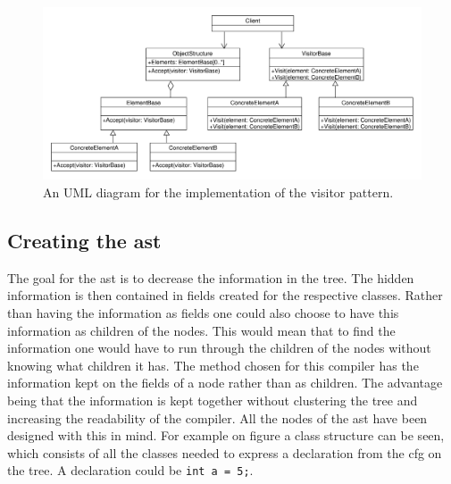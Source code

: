 \begin{figure}[!ht]
\centering
 \includegraphics[width=1\textwidth]{figures/ClassDiagrams/VisitorPattern.pdf} %
\caption{An UML diagram for the implementation of the visitor pattern.}\label{image:visitor}
\vspace{-15pt}
\end{figure}

\subsection{Creating the \acrshort{ast}}\label{CreatingAst}

The goal for the \acrshort{ast} is to decrease the information in the tree.
The hidden information is then contained in fields created for the respective classes.
Rather than having the information as fields one could also choose to have this information as children of the nodes.
This would mean that to find the information one would have to run through the children of the nodes without knowing what children it has.
The method chosen for this compiler has the information kept on the fields of a node rather than as children.
The advantage being that the information is kept together without clustering the tree and increasing the readability of the compiler.
All the nodes of the \acrshort{ast} have been designed with this in mind.
For example on figure  a class structure can be seen, which consists of all the classes needed to express a declaration from the \acrshort{cfg} on the tree.
A declaration could be \texttt{int a = 5;}.

